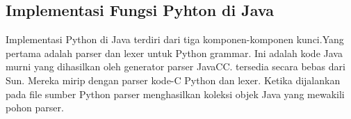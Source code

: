 \documentclass[12pt,a4paper]{article}
\begin{document}
\subsection{Implementasi Fungsi Pyhton di Java}

Implementasi Python di Java terdiri dari tiga komponen-komponen kunci.Yang pertama adalah parser dan lexer untuk Python grammar. Ini adalah kode Java murni yang dihasilkan oleh generator parser JavaCC. tersedia secara bebas dari Sun. Mereka mirip dengan parser kode-C Python dan lexer. Ketika dijalankan pada file sumber Python parser menghasilkan koleksi objek Java yang mewakili pohon parser.
\end{document}
